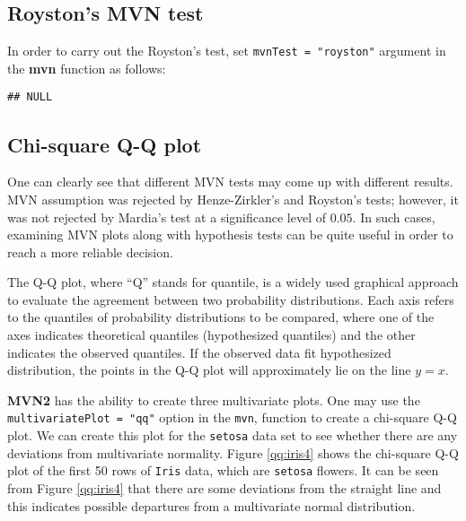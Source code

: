 \documentclass[11pt]{article}\usepackage[]{graphicx}\usepackage[]{color}
\makeatletter
\newenvironment{kframe}{%
 \def\at@end@of@kframe{}%
 \ifinner\ifhmode%
  \def\at@end@of@kframe{\end{minipage}}%
  \begin{minipage}{\columnwidth}%
 \fi\fi%
 \def\FrameCommand##1{\hskip\@totalleftmargin \hskip-\fboxsep
 \colorbox{shadecolor}{##1}\hskip-\fboxsep
     \hskip-\linewidth \hskip-\@totalleftmargin \hskip\columnwidth}%
 \MakeFramed {\advance\hsize-\width
   \@totalleftmargin\z@ \linewidth\hsize
   \@setminipage}}%
 {\par\unskip\endMakeFramed%
 \at@end@of@kframe}
\newenvironment{knitrout}{}{} %
\makeatother
\begin{document}
\subsection{Royston's MVN test} \label{subsec:roysRtexttt}

In order to carry out the Royston's test, set \texttt{mvnTest = "royston"} argument in the \textbf{mvn} function as follows:

\begin{knitrout}
\color{fgcolor}\begin{kframe}
\begin{verbatim}
## NULL
\end{verbatim}
\end{kframe}
\end{knitrout}


\subsection{Chi-square Q-Q plot}

One can clearly see that different MVN tests may come up with different results. MVN assumption was rejected by Henze-Zirkler's and Royston's tests; however, it was not rejected by Mardia's test at a significance level of $0.05$. In such cases, examining MVN plots along with hypothesis tests can be quite useful in order to reach a more reliable decision.

The Q-Q plot, where ``Q'' stands for quantile, is a widely used graphical approach to evaluate the agreement between two probability distributions. Each axis refers to the quantiles of probability distributions to be compared, where one of the axes indicates theoretical quantiles (hypothesized quantiles) and the other indicates the observed quantiles. If the observed data fit hypothesized distribution, the points in the Q-Q plot will approximately lie on the line $y = x$. 

\textbf{MVN2} has the ability to create three multivariate plots. One may use the \texttt{multivariatePlot = "qq"} option in the \texttt{mvn}, function to create a chi-square Q-Q plot. We can create this plot for the \texttt{setosa} data set to see whether there are any deviations from multivariate normality. Figure \ref{qq:iris4} shows the chi-square Q-Q plot of the first 50 rows of \texttt{Iris} data, which are \texttt{setosa} flowers. It can be seen from Figure \ref{qq:iris4} that there are some deviations from the straight line and this indicates possible departures from a multivariate normal distribution.
\end{document}
